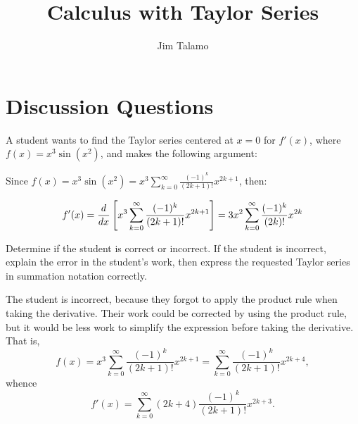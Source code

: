 \documentclass[]{ximera}
\author{Jim Talamo}
\title{Calculus with Taylor Series}
\begin{document}
\begin{abstract}
\end{abstract}
\maketitle

\vspace{-0.9in}

\section{Discussion Questions}

\begin{problem} 

A student wants to find the Taylor series centered at $x=0$ for $f'(x)$, where $f(x) = x^3 \sin(x^2)$, and makes the following argument:

Since $f(x) = x^3 \sin(x^2) = x^3 \sum_{k=0}^{\infty} \frac{(-1)^k}{(2k+1)!}x^{2k+1}$, then:

\begin{align*}
f'(x) = \frac{d}{\mathop{}\!d x} \left[  x^3 \sum_{k=0}^{\infty} \frac{(-1)^k}{(2k+1)!}x^{2k+1} \right] &=  3x^2 \sum_{k=0}^{\infty} \frac{(-1)^k}{(2k)!}x^{2k} \\ 
\end{align*}

Determine if the student is correct or incorrect.  If the student is incorrect, explain the error in the student's work, then express the requested Taylor series in summation notation correctly.

\begin{solution}
The student is incorrect, because they forgot to apply the product rule when taking the derivative. Their work could be corrected by using the product rule, but it would be less work to simplify the expression before taking the derivative. That is,
$$
f(x) = x^3 \sum_{k=0}^{\infty} \frac{(-1)^k}{(2k+1)!}x^{2k+1} = \sum_{k=0}^\infty \frac{(-1)^k}{(2k+1)!}x^{2k+4},
$$
whence
$$
f'(x) = \sum_{k=0}^\infty (2k+4)\frac{(-1)^k}{(2k+1)!}x^{2k+3}.
$$
\end{solution}
\end{problem}
\end{document}
